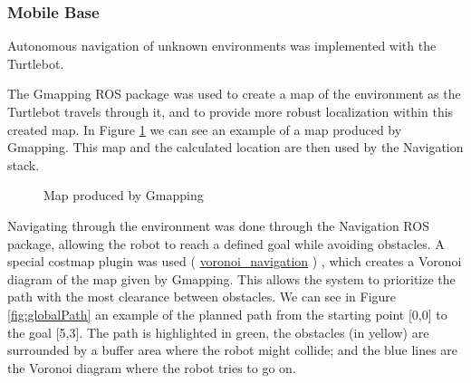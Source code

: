 \documentclass[11pt,a4paper]{article}
\begin{document}
\subsubsection{Mobile Base}
Autonomous navigation of unknown environments was implemented with the Turtlebot.

The Gmapping ROS package was used to create a map of the environment as the Turtlebot travels through it, and to provide more robust localization within this created map. In Figure \ref{fig:gmapping} we can see an example of a map produced by Gmapping. This map and the calculated location are then used by the Navigation stack.


\begin{figure}[ht!]%
	\centering
    \qquad  
    \caption{Map produced by Gmapping}
    \label{fig:gmapping}
\end{figure}

Navigating through the environment was done through the Navigation ROS package, allowing the robot to reach a defined goal while avoiding obstacles. A special costmap plugin was used ( \href{https://github.com/MonicaArias/voronoi_navigation}{voronoi\_navigation} )  , which creates a Voronoi diagram of the map given by Gmapping. This allows the system to prioritize the path with the most clearance between obstacles. We can see in Figure \ref{fig:globalPath} an example of the planned path from the starting point [0,0] to the goal [5,3]. The path is highlighted in green, the obstacles (in yellow) are surrounded by a buffer area where the robot might collide; and the blue lines are the Voronoi diagram where the robot tries to go on.
\end{document}
